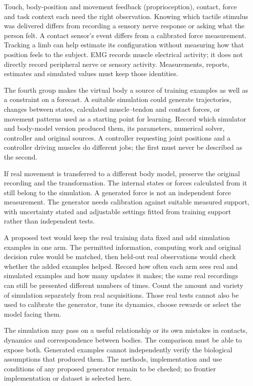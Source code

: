 Touch, body-position and movement feedback (proprioception), contact, force and task context each need the right observation. Knowing which tactile stimulus was delivered differs from recording a sensory nerve response or asking what the person felt. A contact sensor's event differs from a calibrated force measurement. Tracking a limb can help estimate its configuration without measuring how that position feels to the subject. EMG records muscle electrical activity; it does not directly record peripheral nerve or sensory activity. Measurements, reports, estimates and simulated values must keep those identities.

The fourth group makes the virtual body a source of training examples as well as a constraint on a forecast. A suitable simulation could generate trajectories, changes between states, calculated muscle--tendon and contact forces, or movement patterns used as a starting point for learning. Record which simulator and body-model version produced them, its parameters, numerical solver, controller and original sources. A controller requesting joint positions and a controller driving muscles do different jobs; the first must never be described as the second.

If real movement is transferred to a different body model, preserve the original recording and the transformation. The internal states or forces calculated from it still belong to the simulation. A generated force is not an independent force measurement. The generator needs calibration against suitable measured support, with uncertainty stated and adjustable settings fitted from training support rather than independent tests.

A proposed test would keep the real training data fixed and add simulation examples in one arm. The permitted information, computing work and original decision rules would be matched, then held-out real observations would check whether the added examples helped. Record how often each arm sees real and simulated examples and how many updates it makes; the same real recordings can still be presented different numbers of times. Count the amount and variety of simulation separately from real acquisitions. Those real tests cannot also be used to calibrate the generator, tune its dynamics, choose rewards or select the model facing them.

The simulation may pass on a useful relationship or its own mistakes in contacts, dynamics and correspondence between bodies. The comparison must be able to expose both. Generated examples cannot independently verify the biological assumptions that produced them. The methods, implementation and use conditions of any proposed generator remain to be checked; no frontier implementation or dataset is selected here.

